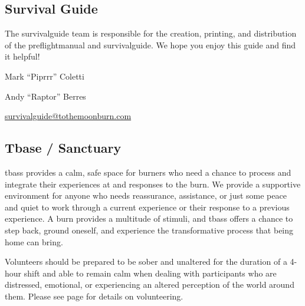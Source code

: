 \subsection*{Survival Guide}
\label{sec:survivalguide}
The \gls{survivalguide} team is responsible for the creation, printing, and distribution of the \gls{preflightmanual} and \gls{survivalguide}. We hope you enjoy this guide and find it helpful!

\begin{description}[leftmargin=6em,noitemsep,style=nextline]
   \item[Lead:] Mark ``Piprrr'' Coletti
   \item[Co-leads:] Andy ``Raptor'' Berres
   \item[Contact:] \url{survivalguide@tothemoonburn.com}
\end{description}


\subsection*{Tbase / Sanctuary}

\Gls{tbass} provides a calm, safe space for burners who need a chance to process and integrate their experiences at and responses to the burn. We provide a supportive environment for anyone who needs reassurance, assistance, or just some peace and quiet to work through a current experience or their response to a previous experience. A burn provides a multitude of stimuli, and \gls{tbass}  offers a chance to step back, ground oneself, and experience the transformative process that being home can bring.

Volunteers should be prepared to be sober and unaltered for the duration of a 4-hour shift and able to remain calm when dealing with participants who are distressed, emotional, or experiencing an altered perception of the world around them.  Please see page \pageref{sec:tbase-training} for details on volunteering.


